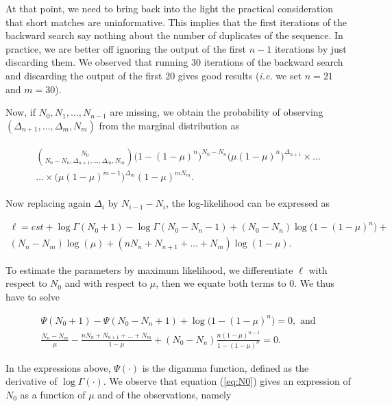 \documentclass{article}
\begin{document}
At that point, we need to bring back into the light the practical
consideration that short matches are uninformative. This implies that the
first iterations of the backward search say nothing about the number of
duplicates of the sequence. In practice, we are better off ignoring the
output of the first $n-1$ iterations by just discarding them. We observed
that running 30 iterations of the backward search and discarding the
output of the first 20 gives good results (\textit{i.e.} we set $n = 21$
and $m=30$).

Now, if $N_0, N_1, \ldots, N_{n-1}$ are missing, we obtain the probability
of observing $(\Delta_{n+1}, \ldots, \Delta_m, N_m)$ from the marginal
distribution as

\begin{align*}
\begin{split}
{N_0 \choose N_0-N_n, \Delta_{n+1}, \ldots, \Delta_m, N_m}
\big(1-(1-\mu)^n\big)^{N_0-N_n}
\big(\mu(1-\mu)^n\big)^{\Delta_{n+1}} \times
\ldots \\
\ldots \times
\big(\mu(1-\mu)^{m-1}\big)^{\Delta_m}(1-\mu)^{mN_m}.
\end{split}
\end{align*}

Now replacing again $\Delta_i$ by $N_{i-1}-N_i$, the log-likelihood can be
expressed as

\begin{equation}
\begin{split}
\ell = cst + \log \Gamma(N_0+1) - \log \Gamma(N_0-N_n-1)
+ (N_0-N_n) \log \big(1-(1-\mu)^n\big) + \\
(N_n-N_m) \log(\mu) + (nN_n + N_{n+1} + \ldots + N_m) \log(1-\mu).
\end{split}
\end{equation}

To estimate the parameters by maximum likelihood, we differentiate $\ell$
with respect to $N_0$ and with respect to $\mu$, then we equate both terms
to 0. We thus have to solve

\begin{gather}
\label{eq:psi}
\Psi(N_0+1)-\Psi(N_0-N_n+1) +
  \log\big( 1-(1-\mu)^n \big) = 0, \text{ and} \\
\label{eq:N0}
\frac{N_n-N_m}{\mu}
-\frac{nN_n + N_{n+1}+\ldots+N_m}{1-\mu} +
(N_0-N_n)\frac{n(1-\mu)^{n-1}}{1-(1-\mu)^n} = 0.
\end{gather}

In the expressions above, $\Psi(\cdot)$ is the digamma function, defined
as the derivative of $\log \Gamma(\cdot)$. We observe that equation
(\ref{eq:N0}) gives an expression of $N_0$ as a function of $\mu$ and of
the observations, namely
\end{document}
